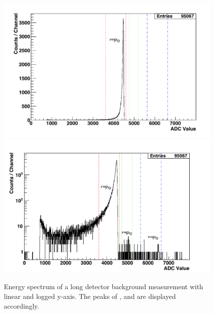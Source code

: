 \begin{figure}[b!]
    \centering
    \includegraphics[scale=0.43]{Chapter_4/Figures/det_background/Spectrum_det_background.pdf}
    \includegraphics[scale=0.43]{Chapter_4/Figures/det_background/LogSpectrum_det_background.pdf}
    \caption[Energy spectrum of a long detector background measurement with linear (left) and logged (right) y-axis. The peaks of \PoTOZ{}, \PoTOE{} and \PoTOF{} are displayed accordingly.]
    {Energy spectrum of a long detector background measurement with linear and logged y-axis. The peaks of \PoTOZ{}, \PoTOE{} and \PoTOF{} are displayed accordingly.}
    \label{fig:detector_background_spectrum}
\end{figure}
%

